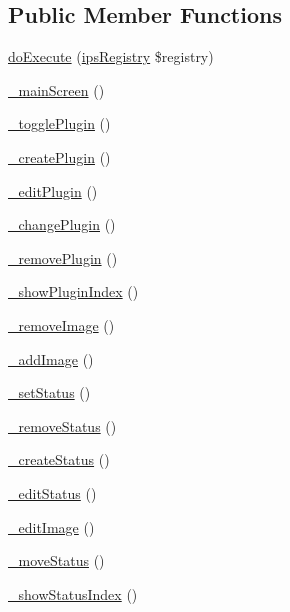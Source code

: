 \subsection*{Public Member Functions}
\begin{DoxyCompactItemize}
\item 
\hyperlink{classadmin__core__report__reports_afbc4e912a0604b94d47d66744c64d8ba}{do\-Execute} (\hyperlink{classips_registry}{ips\-Registry} \$registry)
\item 
\hyperlink{classadmin__core__report__reports_af0d4b2cda2063751a0d768db8f78a38e}{\-\_\-main\-Screen} ()
\item 
\hyperlink{classadmin__core__report__reports_a591d0baf90fc6a01b8ec710404d51304}{\-\_\-toggle\-Plugin} ()
\item 
\hyperlink{classadmin__core__report__reports_ad84d41dbfdb0e1d6a9a70ce76123dc96}{\-\_\-create\-Plugin} ()
\item 
\hyperlink{classadmin__core__report__reports_a2e84184901daa58026531370b9ebc903}{\-\_\-edit\-Plugin} ()
\item 
\hyperlink{classadmin__core__report__reports_a460788ceab1eb4448cddf5de545b04ce}{\-\_\-change\-Plugin} ()
\item 
\hyperlink{classadmin__core__report__reports_a9d3d3fab08e546b05ac20cf98db655db}{\-\_\-remove\-Plugin} ()
\item 
\hyperlink{classadmin__core__report__reports_a1e95862766ac620d724dde29bdd42835}{\-\_\-show\-Plugin\-Index} ()
\item 
\hyperlink{classadmin__core__report__reports_a415137ccf73c4d42495b01de8f41c5cf}{\-\_\-remove\-Image} ()
\item 
\hyperlink{classadmin__core__report__reports_a02a8bc7e1d7de65486009c6cfaf372f7}{\-\_\-add\-Image} ()
\item 
\hyperlink{classadmin__core__report__reports_ad2024cda20fcc28e9d88fd79d2a997ce}{\-\_\-set\-Status} ()
\item 
\hyperlink{classadmin__core__report__reports_a65aa6021bfbd04932c63bd94cb506c5d}{\-\_\-remove\-Status} ()
\item 
\hyperlink{classadmin__core__report__reports_a05422f960d7d936693e3a2e0e21589be}{\-\_\-create\-Status} ()
\item 
\hyperlink{classadmin__core__report__reports_a1e2c53298a612ea40cb896bec8435ac8}{\-\_\-edit\-Status} ()
\item 
\hyperlink{classadmin__core__report__reports_a0806afec2ae167595aa1429d280e2408}{\-\_\-edit\-Image} ()
\item 
\hyperlink{classadmin__core__report__reports_ac2681d219b02111716fc3fcce58833b8}{\-\_\-move\-Status} ()
\item 
\hyperlink{classadmin__core__report__reports_acf48dc9e52d0e5589b32b80436c379cb}{\-\_\-show\-Status\-Index} ()
\end{DoxyCompactItemize}
